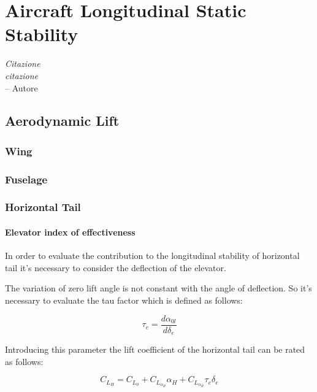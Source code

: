 \chapter{Aircraft Longitudinal Static Stability}
\label{ch:workobject}
\begin{flushright}
	{\smaller
		\textit{Citazione\\ citazione}\\
		-- Autore}
\end{flushright}


\section{Aerodynamic Lift}
\subsection{Wing}
\subsection{Fuselage}
\subsection{Horizontal Tail}
\subsubsection{Elevator index of effectiveness}
 In order to evaluate the contribution to the longitudinal stability of horizontal tail it's necessary to consider the deflection of the elevator. 
		
		
The variation of zero lift angle is not constant with the angle of deflection. So it's necessary to evaluate the tau factor which is defined as follows:

\begin{equation}		 
\tau_e = \frac{d \alpha_{0l}}{d \delta_e}
\end{equation}

		
Introducing this parameter the lift coefficient of the horizontal tail can be rated as follows:

\begin{equation}
C_{L_H}= C_{L_0} + C_{L_{{\alpha}_H}} \alpha_H + 	C_{L_{{\alpha}_H}} \tau_e \delta_e
\end{equation}

